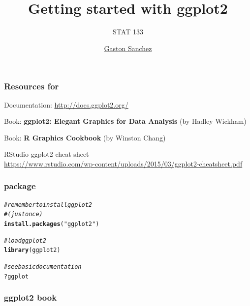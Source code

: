 \documentclass[12pt]{beamer}\usepackage[]{graphicx}\usepackage[]{color}
\title{Getting started with ggplot2}
\subtitle{STAT 133}
\author{\href{http://www.gastonsanchez.com}{Gaston Sanchez}}
\institute{\href{https://github.com/ucb-stat133/stat133-fall-2016}{\tt \scriptsize \color{foreground} github.com/ucb-stat133/stat133-fall-2016}}
\date{}
\makeatletter
\newcommand{\hlstr}[1]{\textcolor[rgb]{0.192,0.494,0.8}{#1}}%
\newcommand{\hlcom}[1]{\textcolor[rgb]{0.678,0.584,0.686}{\textit{#1}}}%
\newcommand{\hlopt}[1]{\textcolor[rgb]{0,0,0}{#1}}%
\newcommand{\hlstd}[1]{\textcolor[rgb]{0.345,0.345,0.345}{#1}}%
\newcommand{\hlkwd}[1]{\textcolor[rgb]{0.737,0.353,0.396}{\textbf{#1}}}%
\newenvironment{kframe}{%
 \def\at@end@of@kframe{}%
 \ifinner\ifhmode%
  \def\at@end@of@kframe{\end{minipage}}%
  \begin{minipage}{\columnwidth}%
 \fi\fi%
 \def\FrameCommand##1{\hskip\@totalleftmargin \hskip-\fboxsep
 \colorbox{shadecolor}{##1}\hskip-\fboxsep
     \hskip-\linewidth \hskip-\@totalleftmargin \hskip\columnwidth}%
 \MakeFramed {\advance\hsize-\width
   \@totalleftmargin\z@ \linewidth\hsize
   \@setminipage}}%
 {\par\unskip\endMakeFramed%
 \at@end@of@kframe}
\newenvironment{knitrout}{}{} %
\makeatother
\begin{document}
{
  \frame{
    \titlepage
  } 
}


\begin{frame}
\begin{center}
\Huge{}
\end{center}
\end{frame}




\begin{frame}[fragile]
\frametitle{Resources for }

\bbi
  \item Documentation: \url{http://docs.ggplot2.org/} 
  \item Book: \textbf{ggplot2: Elegant Graphics for Data Analysis} (by Hadley Wickham)
  \item Book: \textbf{R Graphics Cookbook} (by Winston Chang)
  \item RStudio ggplot2 cheat sheet \\
  {\tiny \url{https://www.rstudio.com/wp-content/uploads/2015/03/ggplot2-cheatsheet.pdf}}
\ei

\end{frame}


\begin{frame}[fragile]
\frametitle{package }
\begin{knitrout}\footnotesize
{}\color{fgcolor}\begin{kframe}
\begin{alltt}
\hlcom{# remember to install ggplot2 }
\hlcom{# (just once)}
\hlkwd{install.packages}\hlstd{(}\hlstr{"ggplot2"}\hlstd{)}


\hlcom{# load ggplot2}
\hlkwd{library}\hlstd{(ggplot2)}


\hlcom{# see basic documentation}
\hlopt{?}\hlstd{ggplot}
\end{alltt}
\end{kframe}
\end{knitrout}

\end{frame}


\begin{frame}[fragile]
\frametitle{ggplot2 book}
\begin{center}
\end{center}
\end{frame}
\end{document}
